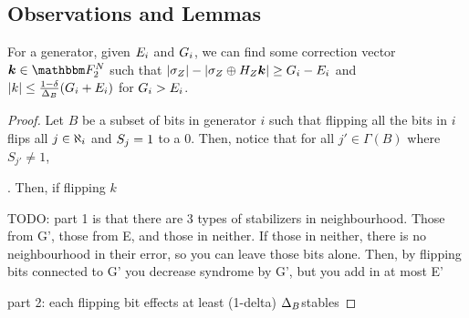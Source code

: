 \subsection*{Observations and Lemmas}

\begin{lemma}{For a generator, given ${E_i}$ and ${G_i}$,
	we can find some correction vector $\correctionvec \in \F_2^\NQubits$
	such that \linebreak $|\sigma_Z| - |\sigma_Z \oplus H_Z\boldsymbol{\boldsymbol{k}}| \geq {G_i} - {E_i}$}
	and $|k| \leq \frac{1-\delta}{{\Delta_{B}}} ({G_i} + {E_i})$ for ${G_i} > {E_i}$.
\label{lemma:decrby}
	\begin{proof}
		Let $B$ be a subset of bits in generator $i$ such that flipping all the bits in $i$ flips all
		$j \in {\aleph_i}$ and $S_j = 1$ to a 0. Then, notice that for all $j' \in \Gamma(B)$ where $S_{j'} \neq 1$,

		. Then, if flipping $k$ 

		TODO:	 part 1 is that there are 3 types of stabilizers in neighbourhood.
		Those from G', those from E, and those in neither. If those in neither, there is no
		neighbourhood in their error, so you can leave those bits alone. Then, by flipping bits
		connected to G' you decrease syndrome by G', but you add in at most E'
		
		part 2: each flipping bit effects at least (1-delta) ${\Delta_{B}}$stables
	\end{proof}
\end{lemma}

